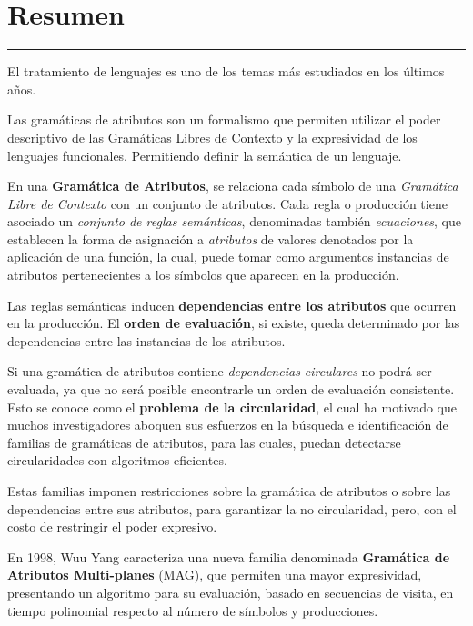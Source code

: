 \documentclass[a4paper,11pt]{ThesisStyle}
\begin{document}
\dominitoc
{}


\cleardoublepage

\chapter*{Resumen}
\noindent\rule[2pt]{\textwidth}{0.5pt}
El tratamiento de lenguajes es uno de los temas más estudiados en los últimos años.

Las gramáticas de atributos son un formalismo que permiten utilizar el poder descriptivo de las Gramáticas Libres de Contexto y la expresividad de los lenguajes funcionales. Permitiendo definir la semántica de un lenguaje.

En una \textbf{Gramática de Atributos}, se relaciona cada símbolo de una \textit{Gramática Libre de Contexto} con un conjunto de atributos. Cada regla o producción tiene asociado un \textit{conjunto de reglas semánticas}, denominadas también \textit{ecuaciones}, que establecen la forma de asignación a \textit{atributos} de valores denotados por la aplicación de una función, la cual, puede tomar como argumentos instancias de atributos pertenecientes a los símbolos que aparecen en la producción.

Las reglas semánticas inducen \textbf{dependencias entre los atributos} que ocurren en la producción. El \textbf{orden de evaluación}, si existe, queda determinado por las dependencias entre las instancias de los atributos.

Si una gramática de atributos contiene \textit{dependencias circulares} no podrá ser evaluada, ya que no será posible encontrarle un orden de evaluación consistente. Esto se conoce como el \textbf{problema de la circularidad}, el cual ha motivado que muchos investigadores aboquen sus esfuerzos en la búsqueda e identificación de familias de gramáticas de atributos, para las cuales, puedan detectarse circularidades con algoritmos eficientes.

Estas familias imponen restricciones sobre la gramática de atributos o sobre las dependencias entre sus atributos, para garantizar la no circularidad, pero, con el costo de restringir el poder expresivo.

En 1998, Wuu Yang caracteriza una nueva familia denominada \textbf{Gramática de Atributos Multi-planes} (MAG), que permiten una mayor expresividad, presentando un algoritmo para su evaluación, basado en secuencias de visita, en tiempo polinomial respecto al número de símbolos y producciones.
\end{document}
